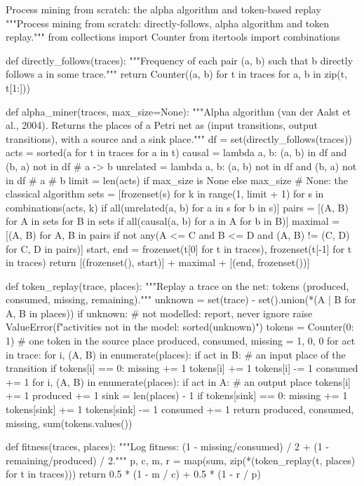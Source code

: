 \begin{pylisting}[label={lst:pm}]{Process mining from scratch: the alpha algorithm and token-based replay}
"""Process mining from scratch: directly-follows, alpha algorithm and token replay."""
from collections import Counter
from itertools import combinations

def directly_follows(traces):
    """Frequency of each pair (a, b) such that b directly follows a in some trace."""
    return Counter((a, b) for t in traces for a, b in zip(t, t[1:]))

def alpha_miner(traces, max_size=None):
    """Alpha algorithm (van der Aalst et al., 2004). Returns the places of a Petri net
    as (input transitions, output transitions), with a source and a sink place."""
    df = set(directly_follows(traces))
    acts = sorted({a for t in traces for a in t})
    causal = lambda a, b: (a, b) in df and (b, a) not in df          # a -> b
    unrelated = lambda a, b: (a, b) not in df and (b, a) not in df   # a # b
    limit = len(acts) if max_size is None else max_size   # None: the classical algorithm
    sets = [frozenset(s) for k in range(1, limit + 1) for s in combinations(acts, k)
            if all(unrelated(a, b) for a in s for b in s)]
    pairs = [(A, B) for A in sets for B in sets
             if all(causal(a, b) for a in A for b in B)]
    maximal = [(A, B) for A, B in pairs
               if not any(A <= C and B <= D and (A, B) != (C, D) for C, D in pairs)]
    start, end = frozenset(t[0] for t in traces), frozenset(t[-1] for t in traces)
    return [(frozenset(), start)] + maximal + [(end, frozenset())]

def token_replay(trace, places):
    """Replay a trace on the net: tokens (produced, consumed, missing, remaining)."""
    unknown = set(trace) - set().union(*(A | B for A, B in places))
    if unknown:                                      # not modelled: report, never ignore
        raise ValueError(f"activities not in the model: {sorted(unknown)}")
    tokens = Counter({0: 1})                         # one token in the source place
    produced, consumed, missing = 1, 0, 0
    for act in trace:
        for i, (A, B) in enumerate(places):
            if act in B:                             # an input place of the transition
                if tokens[i] == 0:
                    missing += 1
                    tokens[i] += 1
                tokens[i] -= 1
                consumed += 1
        for i, (A, B) in enumerate(places):
            if act in A:                             # an output place
                tokens[i] += 1
                produced += 1
    sink = len(places) - 1
    if tokens[sink] == 0:
        missing += 1
        tokens[sink] += 1
    tokens[sink] -= 1
    consumed += 1
    return produced, consumed, missing, sum(tokens.values())

def fitness(traces, places):
    """Log fitness: (1 - missing/consumed) / 2 + (1 - remaining/produced) / 2."""
    p, c, m, r = map(sum, zip(*(token_replay(t, places) for t in traces)))
    return 0.5 * (1 - m / c) + 0.5 * (1 - r / p)
\end{pylisting}

